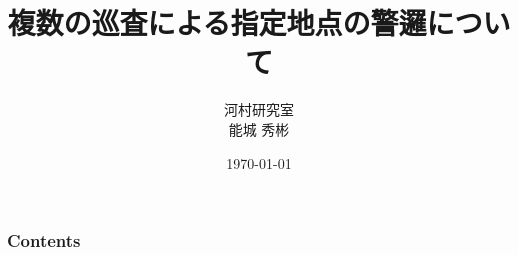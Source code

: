 \documentclass[dvipdfmx,11pt]{beamer}
\title{
	複数の巡査による指定地点の警邏について
}
\author{
	河村研究室\\
	能城 秀彬 \\
}
\date[\today]{\today}
\institute[東京大学]{東京大学}
\begin{document}



\begin{frame}[plain]\frametitle{}
\titlepage %
\end{frame}

\begin{frame}[allowframebreaks]\frametitle{Contents}
\tableofcontents %
\end{frame}





%  
%  
\end{document}
